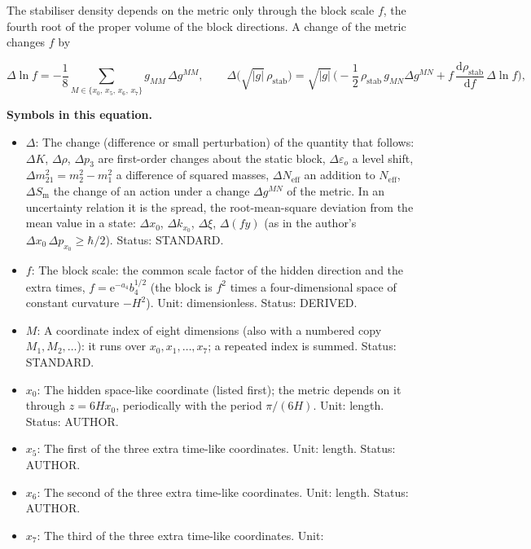 \documentclass[
  10pt,
]{article}
\providecommand{\tightlist}{%
  \setlength{\itemsep}{0pt}\setlength{\parskip}{0pt}}
\begin{document}
The stabiliser density depends on the metric only through the block
scale \(f\), the fourth root of the proper volume of the block
directions. A change of the metric changes \(f\) by

\[
\Delta\ln f = -\frac18\sum_{M\in\{x_0,\,x_5,\,x_6,\,x_7\}}g_{MM}\,\Delta g^{MM},\qquad
\Delta\big(\sqrt{\lvert g\rvert}\,\rho_{\mathrm{stab}}\big) = \sqrt{\lvert g\rvert}\,\Big(-\frac12\,\rho_{\mathrm{stab}}\,g_{MN}\Delta g^{MN}
 + f\,\frac{\mathrm{d}\rho_{\mathrm{stab}}}{\mathrm{d}f}\,\Delta\ln f\Big),
\]

\textbf{Symbols in this equation.}

\begin{itemize}
\tightlist
\item
  \(\Delta\): The change (difference or small perturbation) of the
  quantity that follows: \(\Delta K\), \(\Delta\rho\), \(\Delta p_3\)
  are first-order changes about the static block,
  \(\Delta\varepsilon_o\) a level shift,
  \(\Delta m^2_{21} = m_2^2 - m_1^2\) a difference of squared masses,
  \(\Delta N_{\mathrm{eff}}\) an addition to \(N_{\mathrm{eff}}\),
  \(\Delta S_{\mathrm{m}}\) the change of an action under a change
  \(\Delta g^{MN}\) of the metric. In an uncertainty relation it is the
  spread, the root-mean-square deviation from the mean value in a state:
  \(\Delta x_0\), \(\Delta k_{x_0}\), \(\Delta\xi\), \(\Delta(fy)\) (as
  in the author's \(\Delta x_0\,\Delta p_{x_0} \ge \hbar/2\)). Status:
  STANDARD.
\item
  \(f\): The block scale: the common scale factor of the hidden
  direction and the extra times, \(f = \mathrm{e}^{-a_4}b_4^{1/2}\) (the
  block is \(f^2\) times a four-dimensional space of constant curvature
  \(-H^2\)). Unit: dimensionless. Status: DERIVED.
\item
  \(M\): A coordinate index of eight dimensions (also with a numbered
  copy \(M_1, M_2, \dots\)): it runs over \(x_0, x_1, \dots, x_7\); a
  repeated index is summed. Status: STANDARD.
\item
  \(x_0\): The hidden space-like coordinate (listed first); the metric
  depends on it through \(z = 6Hx_0\), periodically with the period
  \(\pi/(6H)\). Unit: length. Status: AUTHOR.
\item
  \(x_5\): The first of the three extra time-like coordinates. Unit:
  length. Status: AUTHOR.
\item
  \(x_6\): The second of the three extra time-like coordinates. Unit:
  length. Status: AUTHOR.
\item
  \(x_7\): The third of the three extra time-like coordinates. Unit:

\end{itemize}
\end{document}
